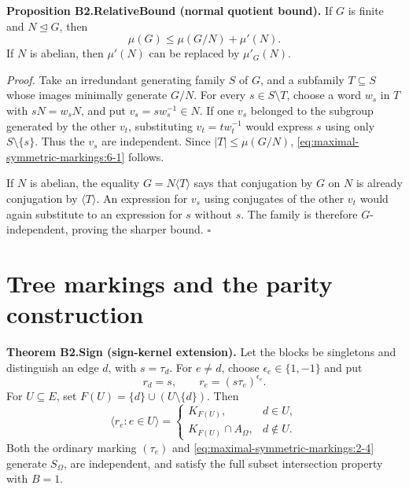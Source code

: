 \textbf{Proposition B2.RelativeBound (normal quotient bound).} If \(G\) is finite and \(N\unlhd G\), then \begin{equation}
\mu(G)\leq \mu(G/N)+\mu'(N).
\label{eq:maximal-symmetric-markings:6-1}
\end{equation} If \(N\) is abelian, then \(\mu'(N)\) can be replaced by \(\mu'_G(N)\).

\emph{Proof.} Take an irredundant generating family \(S\) of \(G\), and a subfamily \(T\subseteq S\) whose images minimally generate \(G/N\). For every \(s\in S\setminus T\), choose a word \(w_s\) in \(T\) with \(sN=w_sN\), and put \(v_s=sw_s^{-1}\in N\). If one \(v_s\) belonged to the subgroup generated by the other \(v_t\), substituting \(v_t=tw_t^{-1}\) would express \(s\) using only \(S\setminus\{s\}\). Thus the \(v_s\) are independent. Since \(|T|\leq \mu(G/N)\), \eqref{eq:maximal-symmetric-markings:6-1} follows.

If \(N\) is abelian, the equality \(G=N\langle T\rangle\) says that conjugation by \(G\) on \(N\) is already conjugation by \(\langle T\rangle\). An expression for \(v_s\) using conjugates of the other \(v_t\) would again substitute to an expression for \(s\) without \(s\). The family is therefore \(G\)-independent, proving the sharper bound. \(\square\)
\section{Tree markings and the parity construction}
\textbf{Theorem B2.Sign (sign-kernel extension).} Let the blocks be singletons and distinguish an edge \(d\), with \(s=\tau_d\). For \(e\ne d\), choose \(\epsilon_e\in\{1,-1\}\) and put \begin{equation}
r_d=s,\qquad r_e=(s\tau_e)^{\epsilon_e}.
\label{eq:maximal-symmetric-markings:2-4}
\end{equation} For \(U\subseteq E\), set \(F(U)=\{d\}\cup(U\setminus\{d\})\). Then \begin{equation}
\langle r_e:e\in U\rangle=
\begin{cases}
K_{F(U)},&d\in U,\\
K_{F(U)}\cap A_\Omega,&d\notin U.
\end{cases}
\label{eq:maximal-symmetric-markings:2-5}
\end{equation} Both the ordinary marking \((\tau_e)\) and \eqref{eq:maximal-symmetric-markings:2-4} generate \(S_\Omega\), are independent, and satisfy the full subset intersection property with \(B=1\).

